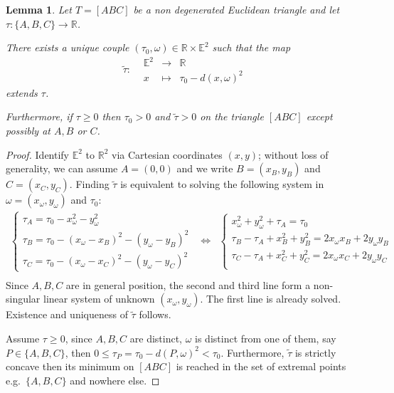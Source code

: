 \documentclass[a4paper,12pt]{article}
\def\E{\mathbf E}
\def\E{\mathbb{E}}
\def\RR{\mathbb{R}}
\def\E{\mathbb{E}}
\newcommand{\function}[5]{\displaystyle#1:\begin{array}{l|rcl}
& \displaystyle #2 & \longrightarrow & \displaystyle #3 \\
	& \displaystyle #4 & \longmapsto & \displaystyle #5 \end{array}}
\newtheorem{lem}{Lemma}[section]		 %
\theoremstyle{definition}
\begin{document}
							
							\begin{lem}\label{lem:prolongement}
								Let $T=[ABC]$ be a non degenerated Euclidean triangle and let $\tau: \{A,B,C\} \rightarrow \RR$.
								
								There exists a unique couple $(\tau_0,\omega)\in \RR\times \E^2$
								such that the map
								 $$\function{\widetilde\tau}{\E^2}{\RR}{x}{\tau_0-d(x,\omega)^2 }$$
								 extends $\tau$.

								 Furthermore, if $\tau\geq 0$ then $\tau_0>0 $ and $\widetilde\tau > 0$ on the triangle $[ABC]$ except possibly at $A,B$ or $C$.
							\end{lem}
							\begin{proof} Identify $\E^2$ to $\RR^2$ via Cartesian coordinates $(x,y)$; without loss of generality, we can assume $A=(0,0)$ and we write $B=(x_B,y_B)$ and $C=(x_C,y_C)$.
							 Finding $\widetilde\tau$ is equivalent to solving the following system in $\omega=(x_\omega,y_\omega)$ and $\tau_0$:
							 \begin{eqnarray*}
							 \left\{ \begin{array}{l}
										\displaystyle \tau_A=\tau_0- x_\omega^2-y_\omega^2 \\
										\displaystyle \tau_B=\tau_0- (x_\omega-x_B)^2-(y_\omega-y_B)^2\\
										\displaystyle \tau_C=\tau_0- (x_\omega-x_C)^2-(y_\omega-y_C)^2
									 \end{array}
									\right. &\Leftrightarrow& \left\{ \begin{array}{l}
										 \displaystyle x_\omega^2+y_\omega^2+\tau_A= \tau_0 \\
										\displaystyle \tau_B-\tau_A+x_B^2+y_B^2=2x_\omega x_B +2y_\omega y_B\\
										\displaystyle \tau_C-\tau_A+x_C^2+y_C^2=2x_\omega x_C +2y_\omega y_C\\
									 \end{array}
									\right. \\
							 \end{eqnarray*}
							 Since $A,B,C$ are in general position, the second and third line form a non-singular linear system of unknown $(x_\omega,y_\omega)$. The first line is already solved.
							 Existence and uniqueness of $\widetilde\tau$ follows.

							 Assume $\tau\geq 0$, since $A,B,C$ are distinct, $\omega$ is distinct from one of them, say $P \in \{A,B,C\}$, then $0\leq \tau_P = \tau_0-d(P,\omega)^2< \tau_0$.
							 Furthermore, $\widetilde\tau$ is strictly concave then its minimum on $[ABC]$ is reached in the set of extremal points e.g.\ $\{A,B,C\}$ and nowhere else. 
							 \end{proof}
\end{document}
